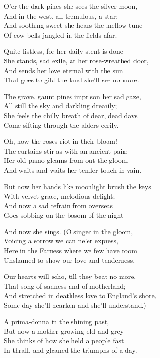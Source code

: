 
\begin{poemblock}
O'er the dark pines she sees the silver moon,\\
\idt And in the west, all tremulous, a star;\\
And soothing sweet she hears the mellow tune\\
\idt Of cow-bells jangled in the fields afar.

Quite listless, for her daily stent is done,\\
\idt She stands, sad exile, at her rose-wreathed door,\\
And sends her love eternal with the sun\\
\idt That goes to gild the land she'll see no more.

The grave, gaunt pines imprison her sad gaze,\\
\idt All still the sky and darkling drearily;\\
She feels the chilly breath of dear, dead days\\
\idt Come sifting through the alders eerily.

Oh, how the roses riot in their bloom!\\
\idt The curtains stir as with an ancient pain;\\
Her old piano gleams from out the gloom,\\
\idt And waits and waits her tender touch in vain.

But now her hands like moonlight brush the keys\\
\idt With velvet grace, melodious delight;\\
And now a sad refrain from overseas\\
\idt Goes sobbing on the bosom of the night.

And now she sings. (O singer in the gloom,\\
\idt Voicing a sorrow we can ne'er express,\\
Here in the Farness where we few have room\\
\idt Unshamed to show our love and tenderness,

Our hearts will echo, till they beat no more,\\
\idt That song of sadness and of motherland;\\
And stretched in deathless love to England's shore,\\
\idt Some day she'll hearken and she'll understand.)

A prima-donna in the shining past,\\
\idt But now a mother growing old and grey,\\
She thinks of how she held a people fast\\
\idt In thrall, and gleaned the triumphs of a day.


\end{poemblock}
